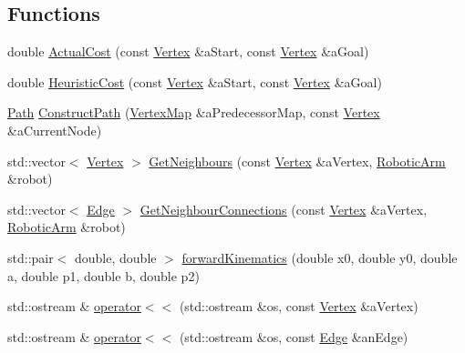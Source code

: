 \subsection*{Functions}
\begin{DoxyCompactItemize}
\item 
double \hyperlink{namespace_path_algorithm_a303daba8d3a083b341d1f4a799c3d5e4}{Actual\+Cost} (const \hyperlink{struct_path_algorithm_1_1_vertex}{Vertex} \&a\+Start, const \hyperlink{struct_path_algorithm_1_1_vertex}{Vertex} \&a\+Goal)
\item 
double \hyperlink{namespace_path_algorithm_a2e4474691c7ebd46c7238f2c53b0e543}{Heuristic\+Cost} (const \hyperlink{struct_path_algorithm_1_1_vertex}{Vertex} \&a\+Start, const \hyperlink{struct_path_algorithm_1_1_vertex}{Vertex} \&a\+Goal)
\item 
\hyperlink{namespace_path_algorithm_a7f2958a43117506f3cb6dc9409a22c0d}{Path} \hyperlink{namespace_path_algorithm_a1b72e8125a5f9fa31d3130c816f1a03f}{Construct\+Path} (\hyperlink{namespace_path_algorithm_ac8a52a9740a0bfa959810bd92e08d962}{Vertex\+Map} \&a\+Predecessor\+Map, const \hyperlink{struct_path_algorithm_1_1_vertex}{Vertex} \&a\+Current\+Node)
\item 
std\+::vector$<$ \hyperlink{struct_path_algorithm_1_1_vertex}{Vertex} $>$ \hyperlink{namespace_path_algorithm_aef18a6e79e7df17ce4923682c4a93fbd}{Get\+Neighbours} (const \hyperlink{struct_path_algorithm_1_1_vertex}{Vertex} \&a\+Vertex, \hyperlink{class_robotic_arm}{Robotic\+Arm} \&robot)
\item 
std\+::vector$<$ \hyperlink{struct_path_algorithm_1_1_edge}{Edge} $>$ \hyperlink{namespace_path_algorithm_a97ee29e1c9bd0b3d157688d1fd0803b4}{Get\+Neighbour\+Connections} (const \hyperlink{struct_path_algorithm_1_1_vertex}{Vertex} \&a\+Vertex, \hyperlink{class_robotic_arm}{Robotic\+Arm} \&robot)
\item 
std\+::pair$<$ double, double $>$ \hyperlink{namespace_path_algorithm_aaa1cdbf02ad31d9d9f0161839a1af45d}{forward\+Kinematics} (double x0, double y0, double a, double p1, double b, double p2)
\item 
std\+::ostream \& \hyperlink{namespace_path_algorithm_a7570fe9b9ed95b023311d0b9ef75b7ea}{operator$<$$<$} (std\+::ostream \&os, const \hyperlink{struct_path_algorithm_1_1_vertex}{Vertex} \&a\+Vertex)
\item 
std\+::ostream \& \hyperlink{namespace_path_algorithm_a4d00bd2dacc6db331429deab0d46cbf3}{operator$<$$<$} (std\+::ostream \&os, const \hyperlink{struct_path_algorithm_1_1_edge}{Edge} \&an\+Edge)
\end{DoxyCompactItemize}


